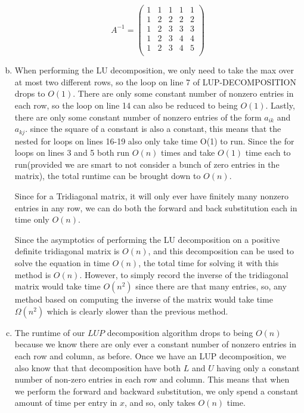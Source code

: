 \documentclass{article}
\begin{document}
\begin{enumerate}[a.]
\[
A^{-1} = \left(\begin{array}{ccccc}
1&1&1&1&1\\
1&2&2&2&2\\
1&2&3&3&3\\
1&2&3&4&4\\
1&2&3&4&5\\
\end{array}\right)
\]
\item
When performing the LU decomposition, we only need to take the max over at most two different rows, so the loop on line 7 of LUP-DECOMPOSITION drops to $O(1)$. There are only some constant number of nonzero entries in each row, so the loop on line 14 can also be reduced to being $O(1)$. Lastly, there are only some constant number of nonzero entries of the form $a_{ik}$ and $a_{kj}$. since the square of a constant is also a constant, this means that the nested for loops on lines 16-19 also only take time O(1) to run. Since the for loops on lines 3 and 5 both run $O(n)$ times and take $O(1)$ time each to run(provided we are smart to not consider a bunch of zero entries in the matrix), the total runtime can be brought down to $O(n)$.

Since for a Tridiagonal matrix, it will only ever have finitely many nonzero entries in any row, we can do both the forward and back substitution each in time only $O(n)$.

Since the asymptotics of performing the LU decomposition on a positive definite tridiagonal matrix is $O(n)$, and this decomposition can be used to solve the equation in time $O(n)$, the total time for solving it with this method is $O(n)$. However, to simply record the inverse of the tridiagonal matrix would take time $O(n^2)$ since there are that many entries, so, any method based on computing the inverse of the matrix would take time $\Omega(n^2)$ which is clearly slower than the previous method.

\item

The runtime of our $LUP$ decomposition algorithm drops to being $O(n)$ because we know there are only ever a constant number of nonzero entries in each row and column, as before. Once we have an LUP decomposition, we also know that that decomposition have both $L$ and $U$ having only a constant number of non-zero entries in each row and column. This means that when we perform the forward and backward substitution, we only spend a constant amount of time per entry in $x$, and so, only takes $O(n)$ time.
\end{enumerate}
\end{document}
